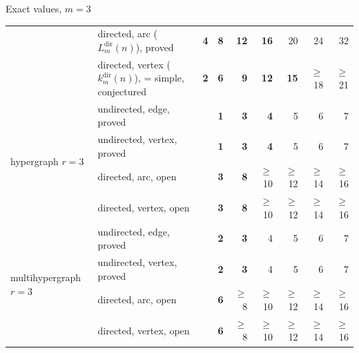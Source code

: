 \documentclass[aspectratio=1610,11pt]{beamer}
\begin{document}
\begin{frame}{Exact values, $m=3$}
{\begin{tabular}{llrrrrrrr}
 & directed, arc ($L_m^{\mathrm{dir}}(n)$), \textcolor{vtProved}{proved} & \textcolor{vtExact}{\textbf{4}} & \textcolor{vtExact}{\textbf{8}} & \textcolor{vtExact}{\textbf{12}} & \textcolor{vtExact}{\textbf{16}} & \textcolor{vtProved}{20} & \textcolor{vtProved}{24} & \textcolor{vtProved}{32} \\
 & directed, vertex ($k_m^{\mathrm{dir}}(n)$), \textcolor{vtConjectured}{= simple, conjectured} & \textcolor{vtExact}{\textbf{2}} & \textcolor{vtExact}{\textbf{6}} & \textcolor{vtExact}{\textbf{9}} & \textcolor{vtExact}{\textbf{12}} & \textcolor{vtExact}{\textbf{15}} & \textcolor{vtConjectured}{$\ge$18} & \textcolor{vtConjectured}{$\ge$21} \\
\midrule
\multirow{4}{*}{hypergraph $r=3$} & undirected, edge, \textcolor{vtProved}{proved} &  & \textcolor{vtExact}{\textbf{1}} & \textcolor{vtExact}{\textbf{3}} & \textcolor{vtExact}{\textbf{4}} & \textcolor{vtProved}{5} & \textcolor{vtProved}{6} & \textcolor{vtProved}{7} \\
 & undirected, vertex, \textcolor{vtProved}{proved} &  & \textcolor{vtExact}{\textbf{1}} & \textcolor{vtExact}{\textbf{3}} & \textcolor{vtExact}{\textbf{4}} & \textcolor{vtProved}{5} & \textcolor{vtProved}{6} & \textcolor{vtProved}{7} \\
 & directed, arc, \textcolor{vtOpen}{open} &  & \textcolor{vtExact}{\textbf{3}} & \textcolor{vtExact}{\textbf{8}} & \textcolor{vtOpen}{$\ge$10} & \textcolor{vtOpen}{$\ge$12} & \textcolor{vtOpen}{$\ge$14} & \textcolor{vtOpen}{$\ge$16} \\
 & directed, vertex, \textcolor{vtOpen}{open} &  & \textcolor{vtExact}{\textbf{3}} & \textcolor{vtExact}{\textbf{8}} & \textcolor{vtOpen}{$\ge$10} & \textcolor{vtOpen}{$\ge$12} & \textcolor{vtOpen}{$\ge$14} & \textcolor{vtOpen}{$\ge$16} \\
\midrule
\multirow{4}{*}{multihypergraph $r=3$} & undirected, edge, \textcolor{vtProved}{proved} &  & \textcolor{vtExact}{\textbf{2}} & \textcolor{vtExact}{\textbf{3}} & \textcolor{vtProved}{4} & \textcolor{vtProved}{5} & \textcolor{vtProved}{6} & \textcolor{vtProved}{7} \\
 & undirected, vertex, \textcolor{vtProved}{proved} &  & \textcolor{vtExact}{\textbf{2}} & \textcolor{vtExact}{\textbf{3}} & \textcolor{vtProved}{4} & \textcolor{vtProved}{5} & \textcolor{vtProved}{6} & \textcolor{vtProved}{7} \\
 & directed, arc, \textcolor{vtOpen}{open} &  & \textcolor{vtExact}{\textbf{6}} & \textcolor{vtOpen}{$\ge$8} & \textcolor{vtOpen}{$\ge$10} & \textcolor{vtOpen}{$\ge$12} & \textcolor{vtOpen}{$\ge$14} & \textcolor{vtOpen}{$\ge$16} \\
 & directed, vertex, \textcolor{vtOpen}{open} &  & \textcolor{vtExact}{\textbf{6}} & \textcolor{vtOpen}{$\ge$8} & \textcolor{vtOpen}{$\ge$10} & \textcolor{vtOpen}{$\ge$12} & \textcolor{vtOpen}{$\ge$14} & \textcolor{vtOpen}{$\ge$16} \\
\bottomrule
\end{tabular}}
\end{frame}
\end{document}
